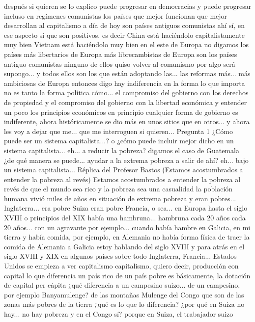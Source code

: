 después si quieren se lo explico puede progresar en democracias y puede progresar incluso en regímenes comunistas los países que mejor funcionan
que mejor desarrollan al capitalismo a día de hoy son países antiguos comunistas ahí sí, en ese aspecto
sí que son positivos, es decir China está haciéndolo capitalistamente muy bien Vietnam está haciéndolo muy bien
en el este de Europa no digamos los países más libertarios de Europa más librecambistas de Europa son los países antiguo comunistas
ninguno de ellos quiso volver al comunismo por algo será supongo... y todos ellos son los que están adoptando las... las reformas más...
más ambiciosas de Europa entonces digo hay indiferencia en la forma lo que importa no es tanto la forma política cómo...
el compromiso del gobierno con los derechos de propiedad y el compromiso del gobierno con la libertad económica
y entender un poco los principios económicos en principio cualquier forma de gobierno es indiferente, ahora históricamente
se dio más en unos sitios que en otros... y ahora les voy a dejar que me... que me interroguen si quieren...
Pregunta 1
¿Cómo puede ser un sistema capitalista...? o ¿cómo puede incluir mejor dicho en un sistema capitalista...
eh... a reducir la pobreza? digamos el caso de Guatemala ¿de qué manera se puede...
ayudar a la extrema pobreza a salir de ahí? eh... bajo un sistema capitalista...
Réplica del Profesor Bastos (Estamos acostumbrados a entender la pobreza al revés)
Estamos acostumbrados a entender la pobreza al revés de que el mundo sea rico y la pobreza sea una casualidad
la población humana vivió miles de años en situación de extrema pobreza y eran pobres...
Inglaterra... era pobre Suiza eran pobre Francia, o sea... en Europa
hasta el siglo XVIII o principios del XIX había una hambruna... hambruna
cada 20 años cada 20 años... con un agravante por ejemplo...
cuando había hambre en Galicia, en mi tierra y había comida, por ejemplo, en Alemania
no había forma física de traer la comida de Alemania a Galicia estoy hablando del siglo XVIII y para atrás
en el siglo XVIII y XIX en algunos países sobre todo Inglaterra, Francia...
Estados Unidos se empieza a ver capitalismo capitalismo, quiero decir, producción con capital
lo que diferencia un país rico de un país pobre es básicamente, la dotación de capital per cápita
¿qué diferencia a un campesino suizo... de un campesino, por ejemplo Banyamulenge?
de las montañas Mulenge del Congo que son de las zonas más pobres de la tierra ¿qué es lo que lo diferencia?
¿por qué en Suiza no hay... no hay pobreza y en el Congo sí? porque en Suiza, el trabajador suizo
